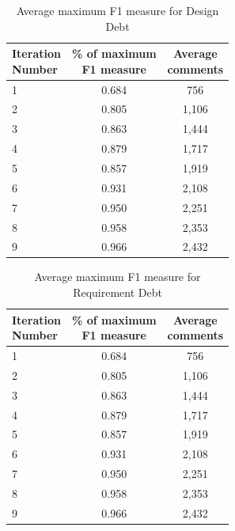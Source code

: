 \begin{table}[!hbt]
    \begin{center}
        \caption{Average maximum F1 measure for Design Debt}
        \label{tbl:design_iteration_performance}
        \begin{tabular}{l| c c }
        \toprule
        \thead{Iteration\\Number} & \thead{\% of maximum\\F1 measure} & \thead{Average\\comments} \\
        \midrule
         1  &  0.684  & 756   \\  
         2  &  0.805  & 1,106 \\  
         3  &  0.863  & 1,444 \\  
         4  &  0.879  & 1,717 \\  
         5  &  0.857  & 1,919 \\  
         6  &  0.931  & 2,108 \\  
         7  &  0.950  & 2,251 \\  
         8  &  0.958  & 2,353 \\  
         9  &  0.966  & 2,432 \\  
        \bottomrule
        \end{tabular}
    \end{center}    
\end{table}

\begin{table}[!hbt]
	\begin{center}
		\caption{Average maximum F1 measure for Requirement Debt}
		\label{tbl:requirement_iteration_performance}
		\begin{tabular}{l| c c }
			\toprule
			\thead{Iteration\\Number} & \thead{\% of maximum\\F1 measure} & \thead{Average\\comments} \\
			\midrule
			1  &  0.684  & 756 \\  
			2  &  0.805  & 1,106 \\  
			3  &  0.863  & 1,444 \\  
			4  &  0.879  & 1,717 \\  
			5  &  0.857  & 1,919 \\  
			6  &  0.931  & 2,108 \\  
			7  &  0.950  & 2,251 \\  
			8  &  0.958  & 2,353 \\  
			9  &  0.966  & 2,432 \\  
			\bottomrule
		\end{tabular}
	\end{center}    
\end{table}

